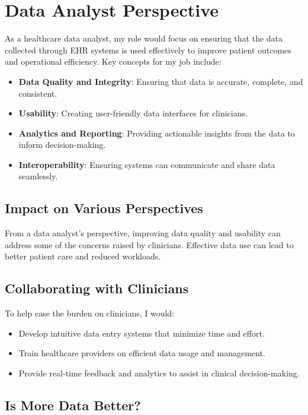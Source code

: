 \documentclass{article}
\begin{document}
\section*{Data Analyst Perspective}

As a healthcare data analyst, my role would focus on ensuring that the data collected through EHR systems is used effectively to improve patient outcomes and operational efficiency. Key concepts for my job include:

\begin{itemize}
    \item \textbf{Data Quality and Integrity}: Ensuring that data is accurate, complete, and consistent.
    \item \textbf{Usability}: Creating user-friendly data interfaces for clinicians.
    \item \textbf{Analytics and Reporting}: Providing actionable insights from the data to inform decision-making.
    \item \textbf{Interoperability}: Ensuring systems can communicate and share data seamlessly.
\end{itemize}

\subsection*{Impact on Various Perspectives}

From a data analyst's perspective, improving data quality and usability can address some of the concerns raised by clinicians. Effective data use can lead to better patient care and reduced workloads.

\subsection*{Collaborating with Clinicians}

To help ease the burden on clinicians, I would:
\begin{itemize}
    \item Develop intuitive data entry systems that minimize time and effort.
    \item Train healthcare providers on efficient data usage and management.
    \item Provide real-time feedback and analytics to assist in clinical decision-making.
\end{itemize}

\subsection*{Is More Data Better?}
\end{document}
